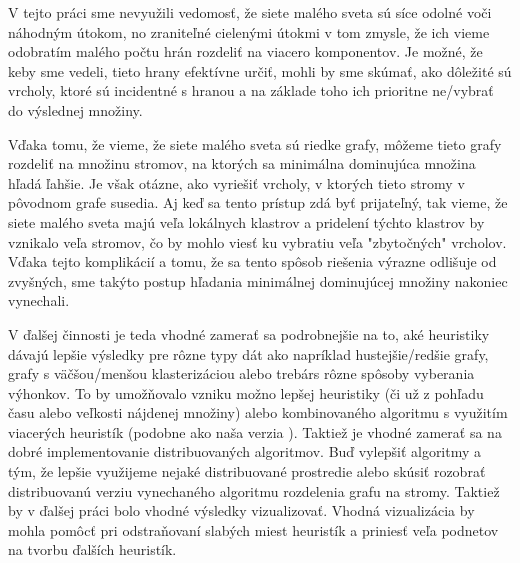 V tejto práci sme nevyužili vedomosť, že siete malého sveta sú síce odolné voči 
náhodným útokom, no zraniteľné cielenými útokmi v tom zmysle, že ich vieme 
odobratím malého počtu hrán rozdeliť na viacero komponentov. Je možné, že keby 
sme vedeli, tieto hrany efektívne určiť, mohli by sme skúmať, ako dôležité sú 
vrcholy, ktoré sú incidentné s hranou a na základe toho ich prioritne ne/vybrať 
do výslednej množiny.

Vďaka tomu, že vieme, že siete malého sveta sú riedke grafy, môžeme tieto grafy 
rozdeliť na množinu stromov, na ktorých sa minimálna dominujúca množina hľadá 
ľahšie. Je však otázne, ako vyriešiť vrcholy, v ktorých tieto stromy v pôvodnom 
grafe susedia. Aj keď sa tento prístup zdá byť prijateľný, tak vieme, že siete 
malého sveta majú veľa lokálnych klastrov a pridelení týchto klastrov by 
vznikalo veľa stromov, čo by mohlo viesť ku vybratiu veľa "zbytočných" 
vrcholov. Vďaka tejto komplikácií a tomu, že sa tento spôsob riešenia výrazne 
odlišuje od zvyšných, sme takýto postup hľadania minimálnej dominujúcej množiny 
nakoniec vynechali.

V ďalšej činnosti je teda vhodné zamerať sa podrobnejšie na to, aké heuristiky 
dávajú lepšie výsledky pre rôzne typy dát ako napríklad hustejšie/redšie grafy, 
grafy s väčšou/menšou klasterizáciou alebo trebárs rôzne spôsoby vyberania 
výhonkov. To by umožňovalo vzniku možno lepšej heuristiky (či už z pohľadu času 
alebo veľkosti nájdenej množiny) alebo kombinovaného algoritmu s využitím 
viacerých heuristík (podobne ako naša verzia ). Taktiež je vhodné 
zamerať sa na dobré implementovanie distribuovaných algoritmov. Buď vylepšiť 
algoritmy  a  tým, že lepšie využijeme nejaké 
distribuované prostredie alebo skúsiť rozobrať distribuovanú verziu vynechaného 
algoritmu rozdelenia grafu na stromy. Taktiež by v ďalšej práci bolo vhodné 
výsledky vizualizovať. Vhodná vizualizácia by mohla pomôcť pri odstraňovaní 
slabých miest heuristík a priniesť veľa podnetov na tvorbu ďalších heuristík.


\cleardoublepage
{}
{}

\printbibliography

\backmatter

\newpage
\pagestyle{empty}
\hbox{}